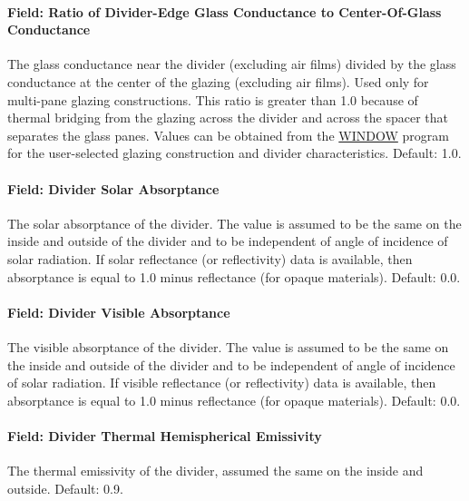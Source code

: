 \paragraph{Field: Ratio of Divider-Edge Glass Conductance to Center-Of-Glass Conductance}\label{field-ratio-of-divider-edge-glass-conductance-to-center-of-glass-conductance}

The glass conductance near the divider (excluding air films) divided by the glass conductance at the center of the glazing (excluding air films). Used only for multi-pane glazing constructions. This ratio is greater than 1.0 because of thermal bridging from the glazing across the divider and across the spacer that separates the glass panes. Values can be obtained from the \href{https://windows.lbl.gov/software-tools#window-heading}{WINDOW} program for the user-selected glazing construction and divider characteristics. Default: 1.0.

\paragraph{Field: Divider Solar Absorptance}\label{field-divider-solar-absorptance}

The solar absorptance of the divider. The value is assumed to be the same on the inside and outside of the divider and to be independent of angle of incidence of solar radiation. If solar reflectance (or reflectivity) data is available, then absorptance is equal to 1.0 minus reflectance (for opaque materials). Default: 0.0.

\paragraph{Field: Divider Visible Absorptance}\label{field-divider-visible-absorptance}

The visible absorptance of the divider. The value is assumed to be the same on the inside and outside of the divider and to be independent of angle of incidence of solar radiation. If visible reflectance (or reflectivity) data is available, then absorptance is equal to 1.0 minus reflectance (for opaque materials). Default: 0.0.

\paragraph{Field: Divider Thermal Hemispherical Emissivity}\label{field-divider-thermal-hemispherical-emissivity}

The thermal emissivity of the divider, assumed the same on the inside and outside. Default: 0.9.

